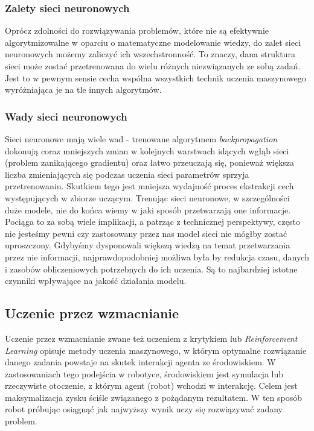 \documentclass[12pt]{article}
\begin{document}
\subsubsection*{Zalety sieci neuronowych}
Oprócz zdolności do rozwiązywania problemów, które nie są efektywnie algorytmizowalne w oparciu o matematyczne modelowanie wiedzy, do zalet sieci neuronowych możemy zaliczyć ich wszechstronność. To znaczy, dana struktura sieci może zostać przetrenowana do wielu różnych niezwiązanych ze sobą zadań. Jest to w pewnym sensie cecha wspólna wszystkich technik uczenia maszynowego wyróżniająca je na tle innych algorytmów.

\subsubsection*{Wady sieci neuronowych}
Sieci neuronowe mają wiele wad - trenowane algorytmem \emph{backpropagation} dokonują coraz mniejszych zmian w kolejnych warstwach idących wgłąb sieci (problem zanikającego gradientu) oraz łatwo przeuczają się, ponieważ większa liczba zmieniających się podczas uczenia sieci parametrów sprzyja przetrenowaniu. Skutkiem tego jest mniejsza wydajność proces ekstrakcji cech występujących w zbiorze uczącym. Trenując sieci neuronowe, w szczególności duże modele, nie do końca wiemy w jaki sposób przetwarzają one informacje. Pociąga to za sobą wiele implikacji, a patrząc z technicznej perspektywy, często nie jesteśmy pewni czy zastosowany przez nas model sieci nie mógłby zostać uproszczony. Gdybyśmy dysponowali większą wiedzą na temat przetwarzania przez nie informacji, najprawdopodobniej możliwa była by redukcja czasu, danych i zasobów obliczeniowych potrzebnych do ich uczenia. Są to najbardziej istotne czynniki wpływające na jakość działania modelu.

\newpage
\subsection{Uczenie przez wzmacnianie}
Uczenie przez wzmacnianie zwane też uczeniem z krytykiem lub \emph{Reinforcement Learning} opisuje metody uczenia maszynowego, w którym optymalne rozwiązanie danego zadania powstaje na skutek interakcji agenta ze środowiskiem. W zastosowaniach tego podejścia w robotyce, środowiskiem jest symulacja lub rzeczywiste otoczenie, z którym agent (robot) wchodzi w interakcję. Celem jest maksymalizacja zysku ściśle związanego z pożądanym rezultatem. W ten sposób robot próbując osiągnąć jak najwyższy wynik uczy się rozwiązywać zadany problem.
\end{document}
